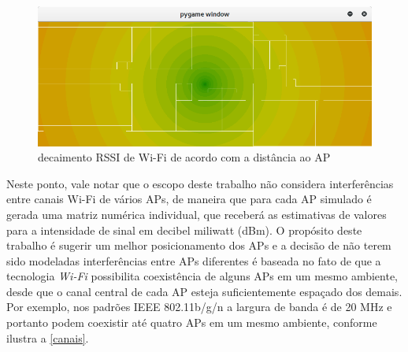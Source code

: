 \documentclass[
	12pt,				%
	openright,			%
	twoside,			%
	a4paper,			%
	english,			%
	french,				%
	spanish,			%
	brazil				%
	]{abntex2}
\begin{document}
\begin{figure}[htb]
	\caption{\label{wifi_central} decaimento RSSI de Wi-Fi de acordo com a distância ao AP}
	\begin{center}
		\includegraphics[scale=0.5]{images/wifi-central.jpg}
	\end{center}
\end{figure}

Neste ponto, vale notar que o escopo deste trabalho não considera interferências entre canais Wi-Fi de vários APs, de maneira que para cada AP simulado é gerada uma matriz numérica individual, que receberá as estimativas de valores para a intensidade de sinal em decibel miliwatt (dBm). O propósito deste trabalho é sugerir um melhor posicionamento dos APs e a decisão de não terem sido modeladas interferências entre APs diferentes é baseada no fato de que a tecnologia \textit{Wi-Fi} possibilita coexistência de alguns APs em um mesmo ambiente, desde que o canal central de cada AP esteja suficientemente espaçado dos demais. Por exemplo, nos padrões IEEE 802.11b/g/n a largura de banda é de 20 MHz e portanto podem coexistir até quatro APs em um mesmo ambiente, conforme ilustra a \autoref{canais}.
\end{document}
